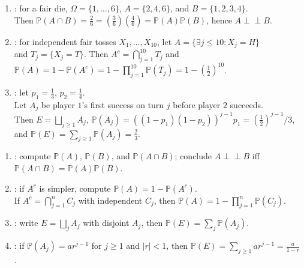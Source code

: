 \begin{example} \label{ex:independence-complement-first-success-examples} 
\begin{enumerate}[label=(\roman*)]
\setlength{\itemsep}{0pt}
\item {}: for a fair die, $\Omega=\{1,\ldots,6\}$, $A=\{2,4,6\}$, and $B=\{1,2,3,4\}$.\\
Then $\mathbb{P}(A\cap B)=\frac{2}{6}=(\frac{3}{6})(\frac{4}{6})=\mathbb{P}(A)\mathbb{P}(B)$, hence $A\perp\!\!\!\perp B$.
\item {}: for independent fair tosses $X_1,\ldots,X_{10}$, let $A=\{\exists j\leq10:X_j=H\}$\\
and $T_j=\{X_j=T\}$. Then $A^c=\bigcap\limits_{j=1}^{10}T_j$ and $\mathbb{P}(A)=1-\mathbb{P}(A^c)=1-\prod\limits_{j=1}^{10}\mathbb{P}(T_j)=1-(\frac{1}{2})^{10}$.
\item {}: let $p_1=\frac{1}{3}$, $p_2=\frac{1}{4}$.\\
Let $A_j$ be player $1$'s first success on turn $j$ before player $2$ succeeds.\\
Then $E=\bigsqcup\limits_{j\geq1}A_j$, $\mathbb{P}(A_j)=((1-p_1)(1-p_2))^{j-1}p_1=(\frac{1}{2})^{j-1}/3$, and $\mathbb{P}(E)=\sum\limits_{j\geq1}\mathbb{P}(A_j)=\frac{2}{3}$.
\end{enumerate}
\end{example}

\begin{method} \label{meth:independence-complement-disjoint-decomposition} 
\begin{enumerate}[label=(\roman*)]
\setlength{\itemsep}{0pt}
\item {}: compute $\mathbb{P}(A)$, $\mathbb{P}(B)$, and $\mathbb{P}(A\cap B)$; conclude $A\perp\!\!\!\perp B$ iff $\mathbb{P}(A\cap B)=\mathbb{P}(A)\mathbb{P}(B)$.
\item {}: if $A^c$ is simpler, compute $\mathbb{P}(A)=1-\mathbb{P}(A^c)$.\\
If $A^c=\bigcap\limits_{j=1}^{n}C_j$ with independent $C_j$, then $\mathbb{P}(A)=1-\prod\limits_{j=1}^{n}\mathbb{P}(C_j)$.
\item {}: write $E=\bigsqcup\limits_jA_j$ with disjoint $A_j$, then $\mathbb{P}(E)=\sum\limits_j\mathbb{P}(A_j)$.
\item {}: if $\mathbb{P}(A_j)=ar^{j-1}$ for $j\geq1$ and $|r|<1$, then $\mathbb{P}(E)=\sum\limits_{j\geq1}ar^{j-1}=\frac{a}{1-r}$.
\end{enumerate}
\end{method}

